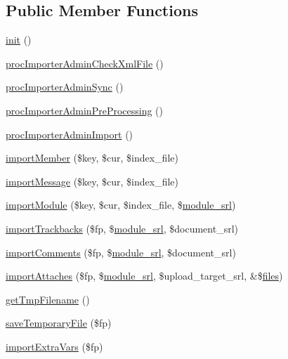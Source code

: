 \subsection*{Public Member Functions}
\begin{DoxyCompactItemize}
\item 
\hyperlink{classimporterAdminController_a5b0172b0077de7de8b718b897b9fb562}{init} ()
\item 
\hyperlink{classimporterAdminController_aa553a8db633713f858c1064a5b8fa621}{proc\+Importer\+Admin\+Check\+Xml\+File} ()
\item 
\hyperlink{classimporterAdminController_a979a756ae2a180270e08f72536c85d74}{proc\+Importer\+Admin\+Sync} ()
\item 
\hyperlink{classimporterAdminController_a112303ff9925d381a27f526b97909205}{proc\+Importer\+Admin\+Pre\+Processing} ()
\item 
\hyperlink{classimporterAdminController_a51a0e3d1bccf3f7c539b119bf394d572}{proc\+Importer\+Admin\+Import} ()
\item 
\hyperlink{classimporterAdminController_a34c3708a45075ca44f1c1e274c5e002d}{import\+Member} (\$key, \$cur, \$index\+\_\+file)
\item 
\hyperlink{classimporterAdminController_a604522c32bf020d51c1c6d868969cf7e}{import\+Message} (\$key, \$cur, \$index\+\_\+file)
\item 
\hyperlink{classimporterAdminController_a7609f3f95b4c1e10be65dfcec57d0d27}{import\+Module} (\$key, \$cur, \$index\+\_\+file, \$\hyperlink{ko_8install_8php_a370bb6450fab1da3e0ed9f484a38b761}{module\+\_\+srl})
\item 
\hyperlink{classimporterAdminController_a9f2397ca84ef0adb182cf2b63b941604}{import\+Trackbacks} (\$fp, \$\hyperlink{ko_8install_8php_a370bb6450fab1da3e0ed9f484a38b761}{module\+\_\+srl}, \$document\+\_\+srl)
\item 
\hyperlink{classimporterAdminController_a5a83e9fecd854dd75464d6f4cd63f344}{import\+Comments} (\$fp, \$\hyperlink{ko_8install_8php_a370bb6450fab1da3e0ed9f484a38b761}{module\+\_\+srl}, \$document\+\_\+srl)
\item 
\hyperlink{classimporterAdminController_a259bb7d8ae0b653dc45e544af3100753}{import\+Attaches} (\$fp, \$\hyperlink{ko_8install_8php_a370bb6450fab1da3e0ed9f484a38b761}{module\+\_\+srl}, \$upload\+\_\+target\+\_\+srl, \&\$\hyperlink{popup_8min_8js_a0742cac2750bccc2d88ac080fb9daa22}{files})
\item 
\hyperlink{classimporterAdminController_a007ae310ca94fb49d96bcdfa3688cb6d}{get\+Tmp\+Filename} ()
\item 
\hyperlink{classimporterAdminController_af263aba79294e35c2027b2e41ac2a198}{save\+Temporary\+File} (\$fp)
\item 
\hyperlink{classimporterAdminController_afa354c44da369a7d71f8d7556632705f}{import\+Extra\+Vars} (\$fp)
\end{DoxyCompactItemize}
